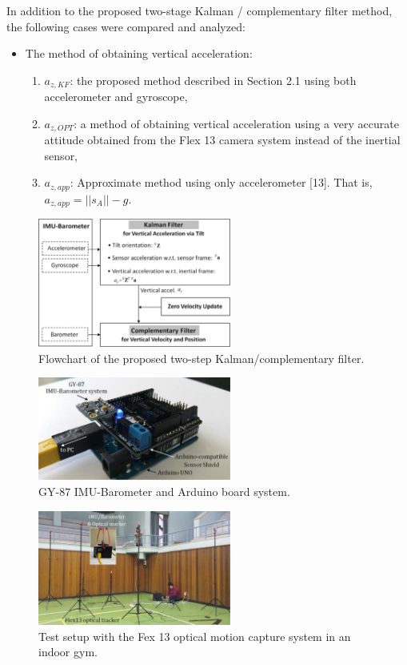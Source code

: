 \documentclass[10pt,journal,compsoc]{IEEEtran}
\begin{document}
In addition to the proposed two-stage Kalman / complementary filter method,
the following cases were compared and analyzed:

\begin{itemize}
\item The method of obtaining vertical acceleration: 
\begin{enumerate}
\item $a_{z,KF}$: the proposed method described in Section 2.1 using both accelerometer and gyroscope,
\item $a_{z,OPT}$: a method of obtaining vertical acceleration using a very accurate attitude obtained from the 
  Flex 13 camera system instead of the inertial sensor,
\item $a_{z,app}$: Approximate method using only accelerometer [13]. That is, $a_{z,app} = ||s_A|| - g$.
\end{enumerate}
\end{itemize}


\begin{figure}[!t]
\centering
\includegraphics[width=2.5in]{fig1}
    \caption{Flowchart of the proposed two-step Kalman/complementary filter.}
\label{fig1}
\end{figure}

\begin{figure}[!t]
\centering
\includegraphics[width=2.5in]{fig2}
\caption{GY-87 IMU-Barometer and Arduino board system.}
\label{fig2}
\end{figure}

\begin{figure}[!t]
\centering
\includegraphics[width=2.5in]{fig3}
\caption{Test setup with the Fex 13 optical motion capture system in an indoor gym.}
\label{fig3}
\end{figure}
\end{document}
